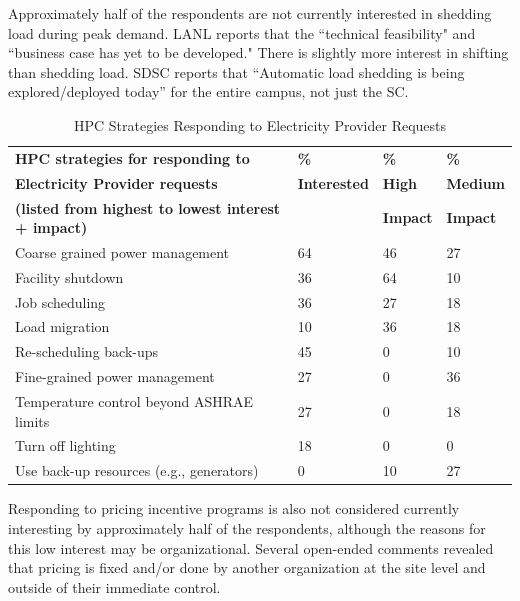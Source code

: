 Approximately half of the respondents are not currently interested in shedding
load during peak demand. LANL reports that the ``technical feasibility" and ``business case has yet to be developed."
There is slightly more interest in shifting than shedding load. SDSC reports that
 ``Automatic load shedding is being explored/deployed today'' for the entire campus, not just the SC.

\begin{table}[htbp]
\centering
\caption{HPC Strategies Responding to Electricity Provider Requests}
\begin{tabular}{|p{2.5in}|p{0.75in}|p{0.75in}|p{0.75in}|} \hline

\textbf{HPC strategies for responding to} &
\textbf{\%} &
\textbf{\%} &
\textbf{\%} \\

\textbf{Electricity Provider requests} &
\textbf{Interested} &
\textbf{High} &
\textbf{Medium} \\

\textbf{(listed from highest to lowest interest + impact)} &
 &
\textbf{Impact} & 
\textbf{Impact} \\
\hline

Coarse grained power management &
64 &
46 &
27 \\
\hline

Facility shutdown&
36 &
64 &
10 \\
\hline

Job scheduling&
36 &
27 &
18 \\
\hline

Load migration &
10 &
36 &
18 \\
\hline

Re-scheduling back-ups &
45 &
0 &
10 \\
\hline

Fine-grained power management &
27 &
0 &
36 \\
\hline

Temperature control beyond ASHRAE limits &
27 &
0 &
18 \\
\hline

Turn off lighting &
18 &
0 &
0 \\
\hline

Use back-up resources (e.g., generators) &
0 &
10 &
27 \\
\hline

\end{tabular}
\label{tab3}
\end{table}
Responding to pricing incentive programs is also not considered currently interesting by approximately half of the respondents, although the reasons for this low interest may be organizational. Several
open-ended comments revealed that pricing is fixed and/or done by another
organization at the site level and outside of their immediate control.

